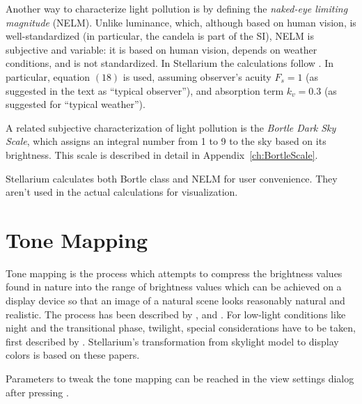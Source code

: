 Another way to characterize light pollution is by defining the \emph{naked-eye limiting magnitude} (NELM). Unlike luminance, which, although based on human vision, is well-standardized (in particular, the candela is part of the SI), NELM is subjective and variable: it is based on human vision, depends on weather conditions, and is not standardized. In Stellarium the calculations follow \citet{Schaefer:LimitingMagnitudes}. In particular, equation $(18)$ is used, assuming observer's acuity $F_s=1$ (as suggested in the text as ``typical observer''), and absorption term $k_v=0.3$ (as suggested for ``typical weather'').

A related subjective characterization of light pollution is the \emph{Bortle Dark Sky Scale}, which assigns an integral number from 1 to 9 to the sky based on its brightness. This scale is described in detail in Appendix~\ref{ch:BortleScale}.

Stellarium calculates both Bortle class and NELM for user convenience. They aren't used in the actual calculations for visualization.

\section{Tone Mapping}

Tone mapping is the process which attempts to compress the brightness
values found in nature into the range of brightness values which can
be achieved on a display device so that an image of a natural scene looks reasonably natural
and realistic. The process has been described by
\citet{TumblinRushmeier:1993}, \citet{Larson:1997} and
\citet{DevlinChalmersWilkie:2002}. For low-light conditions like night
and the transitional phase, twilight, special considerations have to
be taken, first described by \citet{WannJensen:2000}.
Stellarium's transformation from skylight model to display colors is based on these papers.

Parameters to tweak the tone mapping can be reached in the view
settings dialog after pressing .


